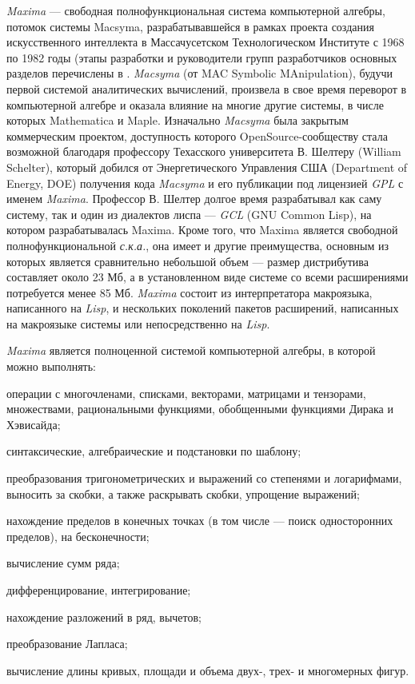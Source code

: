 \textit{Maxima} --- свободная полнофункциональная система компьютерной алгебры, потомок системы Macsyma, разрабатывавшейся в рамках проекта создания искусственного интеллекта в Массачусетском Технологическом Институте с 1968 по 1982 годы (этапы разработки и руководители групп разработчиков основных разделов перечислены в . \textit{Macsyma} (от MAC Symbolic MAnipulation), будучи первой системой аналитических вычислений, произвела в свое время переворот в компьютерной алгебре и оказала влияние на многие другие системы, в числе которых Mathematica и Maple. Изначально \textit{Macsyma} была закрытым коммерческим проектом, доступность которого OpenSource-сообществу стала возможной благодаря профессору Техасского университета В. Шелтеру (William Schelter), который добился от Энергетического Управления США (Department of Energy, DOE) получения кода \textit{Macsyma} и его публикации под лицензией \textit{GPL} с именем \textit{Maxima}. Профессор В. Шелтер долгое время разрабатывал как саму систему, так и один из диалектов лиспа --- \textit{GCL} (GNU Common Lisp), на котором разрабатывалась Maxima.
Кроме того, что Maxima является свободной полнофункциональной \textit{с.к.а.}, она имеет и другие преимущества, основным из которых является сравнительно небольшой объем --- размер дистрибутива составляет около 23 Мб, а в установленном виде системе со всеми расширениями потребуется менее 85 Мб. \textit{Maxima} состоит из интерпретатора макроязыка, написанного на \textit{Lisp}, и нескольких поколений пакетов расширений, написанных на макроязыке системы или непосредственно на \textit{Lisp}.

\textit{Maxima} является полноценной системой компьютерной алгебры, в которой можно выполнять:
\begin{textitemize}
	\item операции с многочленами, списками, векторами, матрицами и тензорами, множествами, рациональными функциями, обобщенными функциями Дирака и Хэвисайда;
	\item синтаксические, алгебраические и подстановки по шаблону;
	\item преобразования тригонометрических и выражений со степенями и логарифмами, выносить за скобки, а также раскрывать скобки, упрощение выражений;
	\item нахождение пределов в конечных точках (в том числе --- поиск односторонних пределов), на бесконечности;
	\item вычисление сумм ряда;
	\item дифференцирование, интегрирование;
	\item нахождение разложений в ряд, вычетов;
	\item преобразование Лапласа;
	\item вычисление длины кривых, площади и объема двух-, трех- и многомерных фигур.
\end{textitemize}

